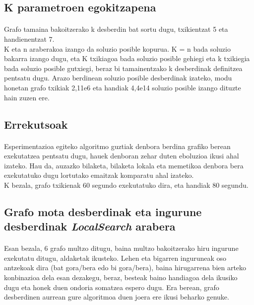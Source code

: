 \documentclass[eu,gi]{ifirak}\usepackage[]{graphicx}\usepackage[]{color}
\begin{document}
\subsection{K parametroen egokitzapena}
\paragraph{}
Grafo tamaina bakoitzerako k desberdin bat sortu dugu, txikientzat 5 eta handienentzat 7.\\

K eta n araberakoa izango da soluzio posible kopurua. K = n bada soluzio bakarra izango dugu, eta K txikiagoa bada soluzio posible gehiegi eta k txikiegia bada soluzio posible gutxiegi, beraz bi tamainentzako k desberdinak definitzea pentsatu dugu. Arazo berdinean soluzio posible desberdinak izateko, modu honetan grafo txikiak 2,11e6 eta handiak 4,4e14 soluzio posible izango dituzte hain zuzen ere.\\

\subsection{Errekutsoak}
\paragraph{}
Esperimentazioa egiteko algoritmo guztiak denbora berdina grafiko berean exekutatzea pentsatu dugu, hauek denboran zehar duten eboluzioa ikusi ahal izateko. Hau da, auzazko bilaketa, bilaketa lokala eta memetikoa denbora bera exekutatuko dugu lortutako emaitzak komparatu ahal izateko.\\
 
K bezala, grafo txikienak 60 segundo exekutatuko dira, eta handiak 80 segundu. 

\pagebreak
\subsection{Grafo mota desberdinak eta ingurune desberdinak \textit{LocalSearch} arabera}
\paragraph{}
	Esan bezala, 6 grafo multzo ditugu, baina multzo bakoitzerako hiru ingurune exekutatu ditugu, aldaketak ikusteko. Lehen eta bigarren inguruneak oso antzekoak dira (bat gora/bera edo bi gora/bera),  baina hirugarrena bien arteko konbinazioa dela esan dezakegu, beraz, besteak baino handiagoa dela ikusiko dugu eta honek duen ondoria somatzea espero dugu.  Era berean, grafo desberdinen aurrean gure algoritmoa duen joera ere ikusi beharko genuke.\\
	
\end{document}
